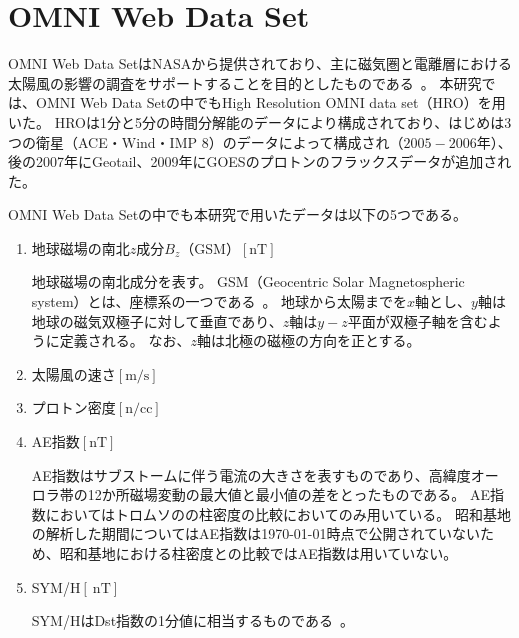 \chapter{OMNI Web Data Set}
\label{app:omni}
OMNI Web Data SetはNASAから提供されており、主に磁気圏と電離層における太陽風の影響の調査をサポートすることを目的としたものである~\cite{king2005solar,king2023omni}。
本研究では、OMNI Web Data Setの中でもHigh Resolution OMNI data set（HRO）を用いた。
HROは1分と5分の時間分解能のデータにより構成されており、はじめは3つの衛星（ACE・Wind・IMP 8）のデータによって構成され（$2005-2006$年）、後の2007年にGeotail、2009年にGOESのプロトンのフラックスデータが追加された。
\par
OMNI Web Data Setの中でも本研究で用いたデータは以下の5つである。
\begin{enumerate}
    \item 地球磁場の南北$z$成分$B_z$（GSM）$[\mathrm{nT}]$
    \par
    地球磁場の南北成分を表す。
    GSM（Geocentric Solar Magnetospheric system）とは、座標系の一つである~\cite{russell1971geophysical}。
    地球から太陽までを$x$軸とし、$y$軸は地球の磁気双極子に対して垂直であり、$z$軸は$y-z$平面が双極子軸を含むように定義される。
    なお、$z$軸は北極の磁極の方向を正とする。

    \item 太陽風の速さ$[\mathrm{m/s}]$
    \item プロトン密度$[\mathrm{n/cc}]$
    \item AE指数$[\mathrm{nT}]$
    \par
    AE指数はサブストームに伴う電流の大きさを表すものであり、高緯度オーロラ帯の12か所磁場変動の最大値と最小値の差をとったものである。
    AE指数においてはトロムソのの柱密度の比較においてのみ用いている。
    昭和基地の解析した期間についてはAE指数は\today 時点で公開されていないため、昭和基地における柱密度との比較ではAE指数は用いていない。

    \item SYM/H$[\ \mathrm{nT}]$
    \par
    SYM/HはDst指数の1分値に相当するものである~\cite{wdc2009asysym}。

\end{enumerate}
